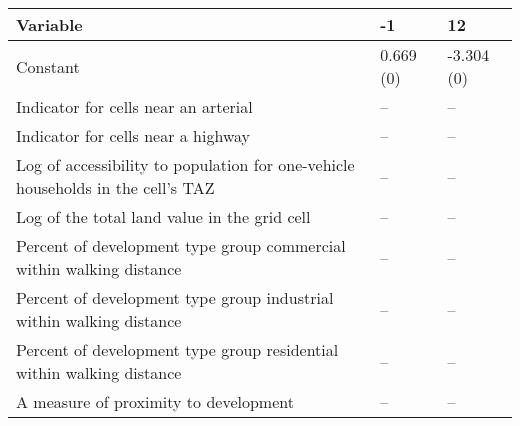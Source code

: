
\begin{tabular}{p{3in}p{0.5in}p{0.5in}}
\hline\hline
Variable & -1 & 12 \\\hline
Constant & 0.669 (0) & -3.304 (0) \\
Indicator for cells near an arterial & -- & -- \\
Indicator for cells near a highway & -- & -- \\
Log of accessibility to population for one-vehicle households in the cell's TAZ & -- & -- \\
Log of the total land value in the grid cell & -- & -- \\
Percent of development type group commercial within walking distance & -- & -- \\
Percent of development type group industrial within walking distance & -- & -- \\
Percent of development type group residential within walking distance & -- & -- \\
A measure of proximity to development & -- & -- \\
\hline\hline
\end{tabular}
